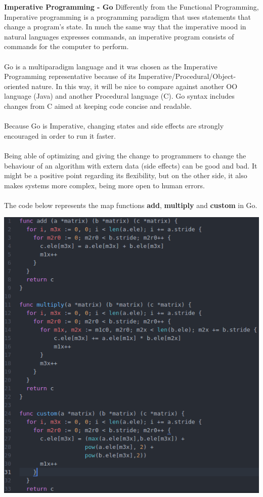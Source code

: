 \documentclass[conference]{IEEEtran}
\begin{document}
\textbf{ Imperative Programming - Go }
Differently from the Functional Programming, Imperative programming is a programming paradigm that uses statements that change a program's state. In much the same way that the imperative mood in natural languages expresses commands, an imperative program consists of commands for the computer to perform.\\\\
Go is a multiparadigm language and it was chosen as the Imperative Programming representative because of its Imperative/Procedural/Object-oriented nature. In this way, it will be nice to compare against another OO language (Java) and another Procedural language (C). Go syntax includes changes from C aimed at keeping code concise and readable.\\\\
Because Go is Imperative, changing states and side effects are strongly encouraged in order to run it faster.\\\\
Being able of optimizing and giving the change to programmers to change the behaviour of an algorithm with extern data (side effects) can be good and bad. It might be a positive point regarding its flexibility, but on the other side, it also makes systems more complex, being more open to human errors.
\\\\
The code below represents the map functions \textbf{add}, \textbf{multiply} and \textbf{custom} in Go.

\includegraphics[scale=0.42]{go_code}
\end{document}
